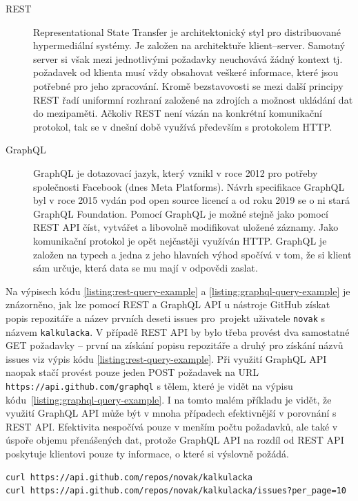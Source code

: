 \begin{description}
    \item[REST] Representational State Transfer je architektonický styl pro distribuované hypermediální systémy. Je založen na architektuře klient--server. Samotný server si však mezi jednotlivými požadavky neuchovává žádný kontext tj. požadavek od klienta musí vždy obsahovat veškeré informace, které jsou potřebné pro jeho zpracování. Kromě bezstavovosti se mezi další principy REST řadí uniformní rozhraní založené na zdrojích a možnost ukládání dat do mezipaměti. \cite{REST} Ačkoliv REST není vázán na konkrétní komunikační protokol, tak se v dnešní době využívá především s protokolem HTTP. \cite{REST-HTTP}
    \item[GraphQL] GraphQL je dotazovací jazyk, který vznikl v roce 2012 pro potřeby společnosti Facebook (dnes Meta Platforms). Návrh specifikace GraphQL byl v roce 2015 vydán pod open source licencí a od roku 2019 se o ni stará GraphQL Foundation. Pomocí GraphQL je možné stejně jako pomocí REST API číst, vytvářet a libovolně modifikovat uložené záznamy. \cite{GraphQL} Jako komunikační protokol je opět nejčastěji využíván HTTP. \cite{GraphQL-HTTP} GraphQL je založen na typech a jedna z jeho hlavních výhod spočívá v tom, že si klient sám určuje, která data se mu mají v odpovědi zaslat. \cite{GraphQL}
\end{description}

Na výpisech kódu \ref{listing:rest-query-example} a \ref{listing:graphql-query-example} je znázorněno, jak lze pomocí REST a GraphQL API u nástroje GitHub získat popis repozitáře a název prvních deseti issues pro~projekt uživatele \texttt{novak} s názvem \texttt{kalkulacka}. V případě REST API by bylo třeba provést dva samostatné GET požadavky -- první na získání popisu repozitáře a druhý pro získání názvů issues viz výpis kódu \ref{listing:rest-query-example}. Při využití GraphQL API naopak stačí provést pouze jeden POST požadavek na URL \texttt{https://api.github.com/graphql} s tělem, které je vidět na výpisu kódu~\ref{listing:graphql-query-example}. I na tomto malém příkladu je vidět, že využití GraphQL API může být v mnoha případech efektivnější v porovnání s REST API. Efektivita nespočívá pouze v menším počtu požadavků, ale také v úspoře objemu přenášených dat, protože GraphQL API na rozdíl od REST API poskytuje klientovi pouze ty informace, o které si výslovně požádá.
 
\begin{listing}[h]
    \caption{Získání informací o repozitáři a issues pomocí REST API}\label{listing:rest-query-example}
    \begin{verbatim}
curl https://api.github.com/repos/novak/kalkulacka
curl https://api.github.com/repos/novak/kalkulacka/issues?per_page=10
    \end{verbatim}
\end{listing}

